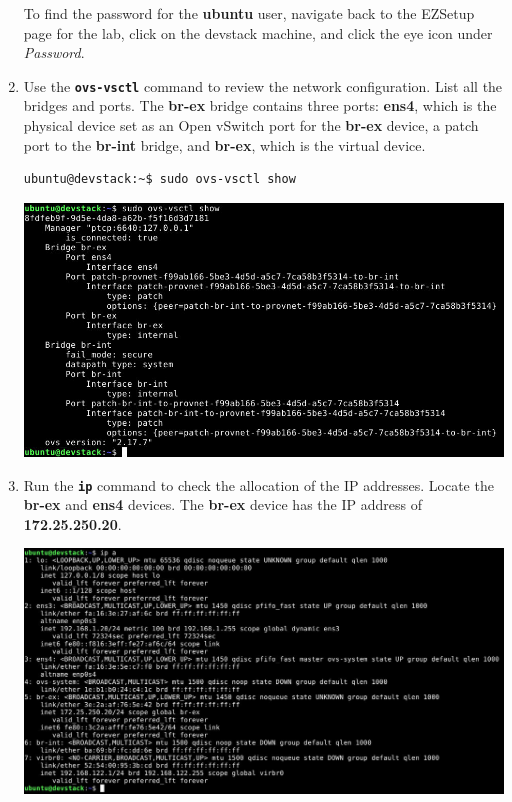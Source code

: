 \documentclass[letterpaper, 12pt]{article}
\begin{document}
\begin{enumerate}
    \begin{tipbox}{}
        To find the password for the \textbf{ubuntu} user, navigate back to the EZSetup page for the lab, click on the
        devstack machine, and click the eye icon under \textit{Password}.
    \end{tipbox}

    \item Use the \textbf{\texttt{ovs-vsctl}} command to review the network configuration. List all the bridges and
    ports. The \textbf{br-ex} bridge contains three ports: \textbf{ens4}, which is the physical device set as an Open
    vSwitch port for the \textbf{br-ex} device, a patch port to the \textbf{br-int} bridge, and \textbf{br-ex}, which is
    the virtual device.
\begin{lstlisting}
ubuntu@devstack:~$ sudo ovs-vsctl show
\end{lstlisting}

    \begin{center}
        \includegraphics[width=\linewidth]{images/part1/step15.png}
    \end{center}

    \item Run the \textbf{\texttt{ip}} command to check the allocation of the IP addresses. Locate the \textbf{br-ex}
    and \textbf{ens4} devices. The \textbf{br-ex} device has the IP address of \textbf{172.25.250.20}.

    \begin{center}
        \includegraphics[width=\linewidth]{images/part1/step16.png}
    \end{center}


\end{enumerate}
\end{document}
